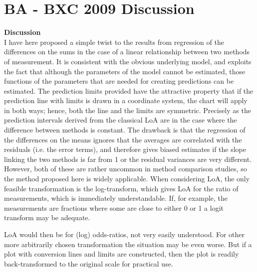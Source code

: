 \documentclass[12pt, a4paper]{report}
\theoremstyle{plain}
\theoremstyle{definition}
\theoremstyle{remark}
\begin{document}
	

	
\section{BA - BXC 2009  Discussion}

\textbf{Discussion}\\
I have here proposed a simple twist to the results from regression of the differences on the sums in the case of a linear relationship
between two methods of measurement. It is consistent with the obvious underlying model, and exploits the fact that although
the parameters of the model cannot be estimated, those functions of the parameters that are needed for creating predictions
can be estimated.
The prediction limits provided have the attractive property that if the prediction line with limits is drawn in a coordinate
system, the chart will apply in both ways; hence, both the line and the limits are symmetric. Precisely as the prediction intervals
derived from the classical LoA are in the case where the difference between methods is constant.
The drawback is that the regression of the differences on the means ignores that the averages are correlated with the residuals
(i.e. the error terms), and therefore gives biased estimates if the slope linking the two methods is far from 1 or the residual
variances are very different. However, both of these are rather uncommon in method comparison studies, so the method proposed
here is widely applicable.
When considering LoA, the only feasible transformation is the log-transform, which gives LoA for the ratio of measurements,
which is immediately understandable. If, for example, the measurements are fractions where some are close to either 0 or 1 a
logit transform may be adequate. 

LoA would then be for (log) odds-ratios, not very easily understood. For other more arbitrarily
chosen transformation the situation may be even worse. But if a plot with conversion lines and limits are constructed, then the
plot is readily back-transformed to the original scale for practical use.
\end{document}
